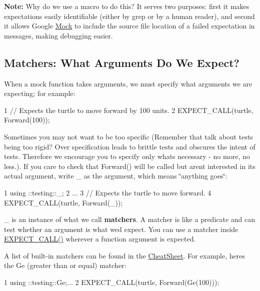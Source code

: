 {\bfseries Note\+:} Why do we use a macro to do this? It serves two purposes\+: first it makes expectations easily identifiable (either by {\ttfamily grep} or by a human reader), and second it allows Google \hyperlink{class_mock}{Mock} to include the source file location of a failed expectation in messages, making debugging easier.

\subsection*{Matchers\+: What Arguments Do We Expect?}

When a mock function takes arguments, we must specify what arguments we are expecting; for example\+:


\begin{DoxyCode}
1 // Expects the turtle to move forward by 100 units.
2 EXPECT\_CALL(turtle, Forward(100));
\end{DoxyCode}


Sometimes you may not want to be too specific (Remember that talk about tests being too rigid? Over specification leads to brittle tests and obscures the intent of tests. Therefore we encourage you to specify only what\textquotesingle{}s necessary -\/ no more, no less.). If you care to check that {\ttfamily Forward()} will be called but aren\textquotesingle{}t interested in its actual argument, write {\ttfamily \+\_\+} as the argument, which means \char`\"{}anything goes\char`\"{}\+:


\begin{DoxyCode}
1 using ::testing::\_;
2 ...
3 // Expects the turtle to move forward.
4 EXPECT\_CALL(turtle, Forward(\_));
\end{DoxyCode}


{\ttfamily \+\_\+} is an instance of what we call {\bfseries matchers}. A matcher is like a predicate and can test whether an argument is what we\textquotesingle{}d expect. You can use a matcher inside {\ttfamily \hyperlink{gmock-spec-builders_8h_a535a6156de72c1a2e25a127e38ee5232}{E\+X\+P\+E\+C\+T\+\_\+\+C\+A\+L\+L()}} wherever a function argument is expected.

A list of built-\/in matchers can be found in the \hyperlink{v1__7_2_cheat_sheet_8md}{Cheat\+Sheet}. For example, here\textquotesingle{}s the {\ttfamily Ge} (greater than or equal) matcher\+:


\begin{DoxyCode}
1 using ::testing::Ge;...
2 EXPECT\_CALL(turtle, Forward(Ge(100)));
\end{DoxyCode}


